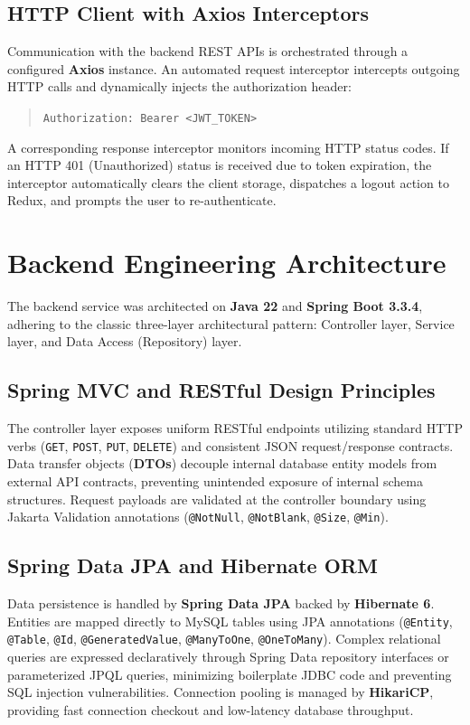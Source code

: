 \subsection{HTTP Client with Axios Interceptors}
Communication with the backend REST APIs is orchestrated through a configured \textbf{Axios} instance. An automated request interceptor intercepts outgoing HTTP calls and dynamically injects the authorization header:
\begin{quote}
\texttt{Authorization: Bearer <JWT\_TOKEN>}
\end{quote}
A corresponding response interceptor monitors incoming HTTP status codes. If an HTTP 401 (Unauthorized) status is received due to token expiration, the interceptor automatically clears the client storage, dispatches a logout action to Redux, and prompts the user to re-authenticate.

\section{Backend Engineering Architecture}
The backend service was architected on \textbf{Java 22} and \textbf{Spring Boot 3.3.4}, adhering to the classic three-layer architectural pattern: Controller layer, Service layer, and Data Access (Repository) layer.

\subsection{Spring MVC and RESTful Design Principles}
The controller layer exposes uniform RESTful endpoints utilizing standard HTTP verbs (\texttt{GET}, \texttt{POST}, \texttt{PUT}, \texttt{DELETE}) and consistent JSON request/response contracts. Data transfer objects (\textbf{DTOs}) decouple internal database entity models from external API contracts, preventing unintended exposure of internal schema structures. Request payloads are validated at the controller boundary using Jakarta Validation annotations (\texttt{@NotNull}, \texttt{@NotBlank}, \texttt{@Size}, \texttt{@Min}).

\subsection{Spring Data JPA and Hibernate ORM}
Data persistence is handled by \textbf{Spring Data JPA} backed by \textbf{Hibernate 6}. Entities are mapped directly to MySQL tables using JPA annotations (\texttt{@Entity}, \texttt{@Table}, \texttt{@Id}, \texttt{@GeneratedValue}, \texttt{@ManyToOne}, \texttt{@OneToMany}). Complex relational queries are expressed declaratively through Spring Data repository interfaces or parameterized JPQL queries, minimizing boilerplate JDBC code and preventing SQL injection vulnerabilities. Connection pooling is managed by \textbf{HikariCP}, providing fast connection checkout and low-latency database throughput.

